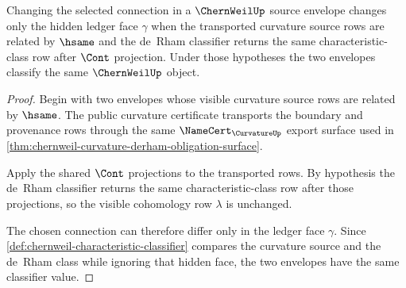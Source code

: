 \begin{theorem}
\label{thm:chernweil-connection-choice-stability}
Changing the selected connection in a $\ChernWeilUp$ source envelope changes only the hidden ledger face $\gamma$ when the transported curvature source rows are related by $\hsame$ and the de~Rham classifier returns the same characteristic-class row after $\Cont$ projection. Under those hypotheses the two envelopes classify the same $\ChernWeilUp$ object.
\end{theorem}
\begin{proof}
Begin with two envelopes whose visible curvature source rows are related by $\hsame$. The public curvature certificate transports the boundary and provenance rows through the same $\NameCert_{\CurvatureUp}$ export surface used in \autoref{thm:chernweil-curvature-derham-obligation-surface}.

Apply the shared $\Cont$ projections to the transported rows. By hypothesis the de~Rham classifier returns the same characteristic-class row after those projections, so the visible cohomology row $\lambda$ is unchanged.

The chosen connection can therefore differ only in the ledger face $\gamma$. Since \autoref{def:chernweil-characteristic-classifier} compares the curvature source and the de~Rham class while ignoring that hidden face, the two envelopes have the same classifier value.
\end{proof}

